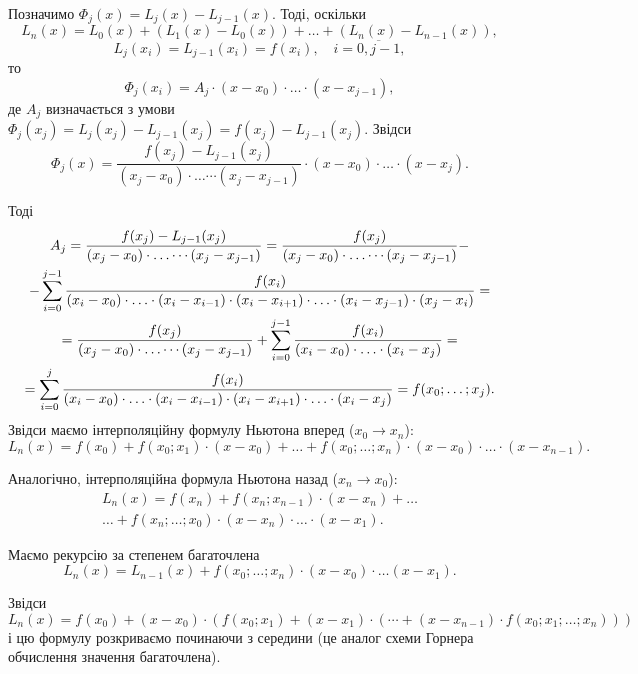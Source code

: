 Позначимо $\Phi_j(x) = L_j(x) - L_{j-1}(x)$. Тоді, оскільки
\[ L_n(x) = L_0(x) + (L_1(x) - L_0(x)) + \ldots + (L_n(x) - L_{n-1}(x)), \]
\[ L_j(x_i) = L_{j-1}(x_i) = f(x_i), \quad i = \overline{0,j-1},\]
то
\begin{equation}
    \label{eq:6.16}
    \Phi_j(x_i) = A_j \cdot (x - x_0) \cdot \ldots \cdot (x - x_{j-1}),
\end{equation}
де $A_j$ визначається з умови $\Phi_j(x_j) = L_j(x_j) - L_{j-1}(x_j) = f(x_j) - L_{j-1}(x_j)$. Звідси
\[ \Phi_j(x) = \dfrac{f(x_j)-L_{j-1}(x_j)}{(x_j-x_0)\cdot\ldots\cdots(x_j-x_{j-1})}\cdot(x-x_0)\cdot\ldots\cdot(x-x_j).\] 

Тоді
\begin{multline*}
    A_j = \dfrac{f(x_j)-L_{j-1}(x_j)}{(x_j-x_0)\cdot\ldots\cdots(x_j-x_{j-1})} = \dfrac{f(x_j)}{(x_j-x_0)\cdot\ldots\cdots(x_j-x_{j-1})} - \\
    - \displaystyle\sum\limits_{i=0}^{j-1} \dfrac{f(x_i)}{(x_i-x_0)\cdot\ldots\cdot(x_i-x_{i-1})\cdot(x_i-x_{i+1})\cdot\ldots\cdot(x_i-x_{j-1})\cdot(x_j-x_i)} = \\
    = \dfrac{f(x_j)}{(x_j-x_0)\cdot\ldots\cdots(x_j-x_{j-1})} + \displaystyle\sum\limits_{i=0}^{j-1} \dfrac{f(x_i)}{(x_i-x_0)\cdot\ldots\cdot(x_i-x_j)} =  \\
    = \displaystyle\sum\limits_{i=0}^j \dfrac{f(x_i)}{(x_i-x_0)\cdot\ldots\cdot(x_i-x_{i-1})\cdot(x_i-x_{i+1})\cdot\ldots\cdot(x_i-x_j)} = f(x_0;\ldots;x_j).
\end{multline*}
Звідси маємо інтерполяційну формулу Ньютона вперед ($x_0 \to x_n$):
\begin{equation}
    \label{eq:6.17}
    L_n(x) = f(x_0) + f(x_0;x_1) \cdot (x-x_0) + \ldots + f(x_0;\ldots;x_n) \cdot (x-x_0) \cdot \ldots \cdot (x-x_{n-1}).
\end{equation}

Аналогічно, інтерполяційна формула Ньютона назад ($x_n\to x_0$):
\begin{multline}
    \label{eq:6.18}
    L_n(x) = f(x_n) + f(x_n;x_{n-1}) \cdot (x-x_n) + \ldots \\
    \ldots + f(x_n;\ldots;x_0) \cdot (x-x_n) \cdot \ldots \cdot (x-x_1).
\end{multline}

Маємо рекурсію за степенем багаточлена 
\[ L_n(x) = L_{n-1}(x) + f(x_0;\ldots;x_n)\cdot(x-x_0)\cdot\ldots(x-x_1).\]

Звідси \[L_n(x) = f(x_0) + (x-x_0)\cdot(f(x_0;x_1)+(x-x_1)\cdot(\cdots+(x-x_{n-1})\cdot f(x_0;x_1;\ldots;x_n)))\] і цю формулу розкриваємо починаючи з середини (це аналог схеми Горнера обчислення значення багаточлена). \\

